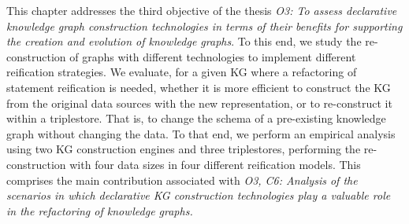 This chapter addresses the third objective of the thesis \textit{O3: To assess declarative knowledge graph construction technologies in terms of their benefits for supporting the creation and evolution of knowledge graphs}.
To this end, we study the re-construction of graphs with different technologies to implement different reification strategies. We evaluate, for a given KG where a refactoring of statement reification is needed, whether it is more efficient to construct the KG from the original data sources with the new representation, or to re-construct it within a triplestore. 
That is, to change the schema of a pre-existing knowledge graph without changing the data. To that end, we perform an empirical analysis using two KG construction engines and three triplestores, performing the re-construction with four data sizes in four different reification models. 
This comprises the main contribution associated with \textit{O3, C6: Analysis of the scenarios in which declarative KG construction technologies play a valuable role in the refactoring of knowledge graphs.}


